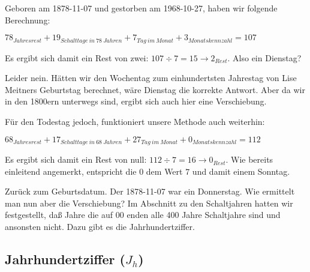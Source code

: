 \documentclass[version=last,paper=A4,fontsize=11pt,DIV=18]{scrartcl}
\begin{document}
Geboren am 1878-11-07 und gestorben am 1968-10-27, haben wir folgende Berechnung:

\begin{center}
    $78_{Jahresrest} + 19_{Schalttage\:in\:78\:Jahren} + 7_{Tag\:im\:Monat} + 3_{Monatskennzahl} = 107$
\end{center}

Es ergibt sich damit ein Rest von zwei: $107 \div 7 = 15 \rightarrow 2_{Rest}$. Also ein Dienstag?

Leider nein. Hätten wir den Wochentag zum einhundertsten Jahrestag von Lise Meitners Geburtstag berechnet, wäre Dienstag die korrekte Antwort. Aber da wir in den 1800ern unterwegs sind, ergibt sich auch hier eine Verschiebung.

Für den Todestag jedoch, funktioniert unsere Methode auch weiterhin:
\begin{center}
    $68_{Jahresrest} + 17_{Schalttage\:in\:68\:Jahren} + 27_{Tag\:im\:Monat} + 0_{Monatskennzahl} = 112$
\end{center}

Es ergibt sich damit ein Rest von null: $112 \div 7 = 16 \rightarrow 0_{Rest}$. Wie bereits einleitend angemerkt, entspricht die $0$ dem Wert $7$ und damit einem Sonntag.

Zurück zum Geburtsdatum. Der 1878-11-07 war ein Donnerstag. Wie ermittelt man nun aber die Verschiebung? Im Abschnitt zu den Schaltjahren hatten wir festgestellt, daß Jahre die auf 00 enden alle 400 Jahre Schaltjahre sind und ansonsten nicht. Dazu gibt es die Jahrhundertziffer.

\subsection*{Jahrhundertziffer ($J_h$)}



\end{document}
